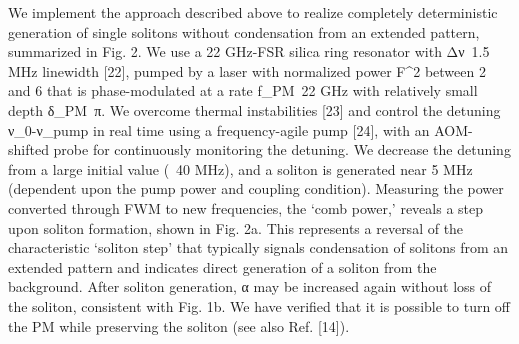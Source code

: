 We implement the approach described above to realize completely deterministic generation of single solitons without condensation from an extended pattern, summarized in Fig. 2. We use a 22 GHz-FSR silica ring resonator with Δν~1.5 MHz linewidth [22], pumped by a laser with normalized power F^2 between 2 and 6 that is phase-modulated at a rate f_PM~22 GHz with relatively small depth δ_PM~π. We overcome thermal instabilities [23] and control the detuning ν_0-ν_pump in real time using a frequency-agile pump [24], with an AOM-shifted probe for continuously monitoring the detuning. We decrease the detuning from a large initial value (~40 MHz), and a soliton is generated near 5 MHz (dependent upon the pump power and coupling condition). Measuring the power converted through FWM to new frequencies, the ‘comb power,’ reveals a step upon soliton formation, shown in Fig. 2a. This represents a reversal of the characteristic ‘soliton step’ that typically signals condensation of solitons from an extended pattern and indicates direct generation of a soliton from the background. After soliton generation, α may be increased again without loss of the soliton, consistent with Fig. 1b. We have verified that it is possible to turn off the PM while preserving the soliton (see also Ref.  [14]). 



